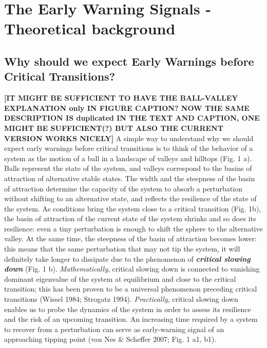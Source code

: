 \documentclass[12pt,a4paper,final]{article}
\begin{document}
\section{The Early Warning Signals - Theoretical background} 

\subsection{Why should we expect Early Warnings before Critical Transitions?}
{\bf [IT MIGHT BE SUFFICIENT TO HAVE THE BALL-VALLEY EXPLANATION only IN FIGURE CAPTION? NOW THE SAME DESCRIPTION IS duplicated IN THE TEXT AND CAPTION, ONE MIGHT BE SUFFICIENT(?) BUT ALSO THE CURRENT VERSION WORKS NICELY]}
A simple way to understand why we should expect early warnings before critical transitions is to think of the behavior of a system as the motion of a ball in a landscape of valleys and hilltops (Fig. 1 a). Balls represent the state of the system, and valleys correspond to the basins of attraction of alternative stable states. The width and the steepness of the basin of attraction determine the capacity of the system to absorb a perturbation without shifting to an alternative state, and reflects the resilience of the state of the system. As conditions bring the system close to a critical transition (Fig. 1b), the basin of attraction of the current state of the system shrinks and so does its resilience: even a tiny perturbation is enough to shift the sphere to the alternative valley. At the same time, the steepness of the basin of attraction becomes lower: this means that the same perturbation that may not tip the system, it will definitely take longer to dissipate due to the phenomenon of \textit{\textbf{critical slowing down}} (Fig. 1 b). \textit{Mathematically}, critical slowing down is connected to vanishing dominant eigenvalue of the system at equilibrium and close to the critical transition; this has been proven to be a universal phenomenon preceding critical transitions  (Wissel 1984; Strogatz 1994). \textit{Practically}, critical slowing down enables us to probe the dynamics of the system in order to assess its resilience and the risk of an upcoming transition. An increasing time required by a system to recover from a perturbation can serve as early-warning signal of an approaching tipping point (van Nes \& Scheffer 2007; Fig. 1 a1, b1).
\end{document}
